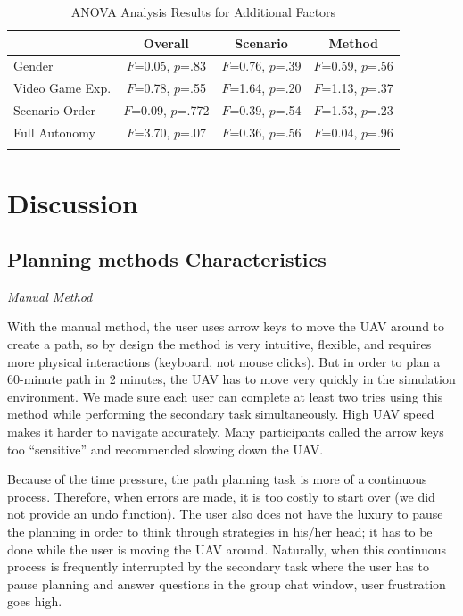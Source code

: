 \documentclass[lettersize, apacite, twoside, HRI]{apa_HRI}
\begin{document}
\begin{table}
\caption{ANOVA Analysis Results for Additional Factors}
\scriptsize
	\centering
		\begin{tabular}
			{|l|c|c|c|}
			\hline
			 & Overall & Scenario & Method \\
			\hline
			Gender & $F$=0.05, $p$=.83 & $F$=0.76, $p$=.39 & $F$=0.59, $p$=.56 \\
			\hline
			Video Game Exp. & $F$=0.78, $p$=.55 & $F$=1.64, $p$=.20 & $F$=1.13, $p$=.37 \\
			\hline
			Scenario Order & $F$=0.09, $p$=.772 & $F$=0.39, $p$=.54 & $F$=1.53, $p$=.23 \\
			\hline
			Full Autonomy & $F$=3.70, $p$=.07 & $F$=0.36, $p$=.56 & $F$=0.04, $p$=.96 \\
			\hline		
			\multicolumn{4}{c}{}  %
		\end{tabular}
\label{OtherFactors}
\end{table}

\section{Discussion} 
\label{sec:Discussion}

\subsection{Planning methods Characteristics}

\noindent \textit{Manual Method}

With the manual method, the user uses arrow keys to move the UAV around to create a path, so by design the method is very intuitive, flexible, and requires more physical interactions (keyboard, not mouse clicks). But in order to plan a 60-minute path in 2 minutes, the UAV has to move very quickly in the simulation environment. We made sure each user can complete at least two tries using this method while performing the secondary task simultaneously. High UAV speed makes it harder to navigate accurately. Many participants called the arrow keys too ``sensitive'' and recommended slowing down the UAV. 

Because of the time pressure, the path planning task is more of a continuous process. Therefore, when errors are made, it is too costly to start over (we did not provide an undo function). The user also does not have the luxury to pause the planning in order to think through strategies in his/her head; it has to be done while the user is moving the UAV around. Naturally, when this continuous process is frequently interrupted by the secondary task where the user has to pause planning and answer questions in the group chat window, user frustration goes high. 
\end{document}
